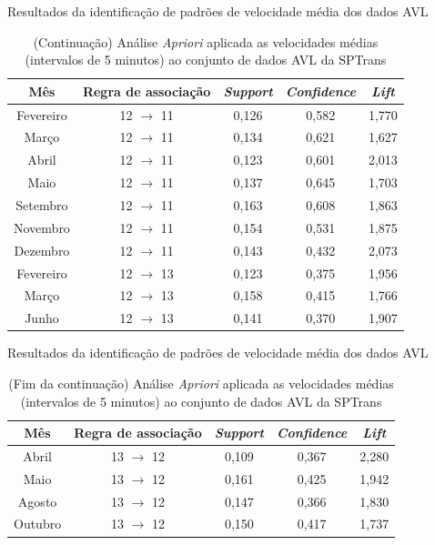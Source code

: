 \documentclass{beamer}
\begin{document}
\begin{frame}{Resultados da identificação de padrões de velocidade média dos dados AVL}
\begin{table}[!htb]
\centering
\caption {(Continuação) Análise \textit{Apriori} aplicada as velocidades médias (intervalos de 5 minutos) ao conjunto de dados AVL da SPTrans}
\label {tab:aprioriFull}
\begin{adjustbox}{max height=10mm, width=4in}
\begin{tabular}{c|c|c|c|c}
\toprule
\textbf{Mês} & \textbf{Regra de associação} & \textit{\textbf{Support}} & \textit{\textbf{Confidence}} & \textit{\textbf{Lift}} \\
\midrule
Fevereiro & 12 $\rightarrow$ 11 & 0,126 & 0,582 & 1,770\\
Março & 12 $\rightarrow$ 11 & 0,134 & 0,621 & 1,627\\
Abril & 12 $\rightarrow$ 11 & 0,123 & 0,601 & 2,013\\
Maio & 12 $\rightarrow$ 11 & 0,137 & 0,645 & 1,703\\
Setembro & 12 $\rightarrow$ 11 & 0,163 & 0,608 & 1,863\\
Novembro & 12 $\rightarrow$ 11 & 0,154 & 0,531 & 1,875\\
Dezembro & 12 $\rightarrow$ 11 & 0,143 & 0,432 & 2,073\\
\midrule
Fevereiro & 12 $\rightarrow$ 13 & 0,123 & 0,375 & 1,956\\
Março & 12 $\rightarrow$ 13 & 0,158 & 0,415 & 1,766\\
Junho & 12 $\rightarrow$ 13 & 0,141 & 0,370 & 1,907\\
\bottomrule
\end{tabular}
\end{adjustbox}
\end{table}
\end{frame}
\begin{frame}{Resultados da identificação de padrões de velocidade média dos dados AVL}
\begin{table}[!htb]
\centering
\caption {(Fim da continuação) Análise \textit{Apriori} aplicada as velocidades médias (intervalos de 5 minutos) ao conjunto de dados AVL da SPTrans}
\label {tab:aprioriFull}
\begin{adjustbox}{max height=10mm, width=4in}
\begin{tabular}{c|c|c|c|c}
\toprule
\textbf{Mês} & \textbf{Regra de associação} & \textit{\textbf{Support}} & \textit{\textbf{Confidence}} & \textit{\textbf{Lift}} \\
\midrule
Abril  & 13 $\rightarrow$ 12 & 0,109 & 0,367 & 2,280\\
Maio & 13 $\rightarrow$ 12 & 0,161 & 0,425 & 1,942\\
Agosto & 13 $\rightarrow$ 12 & 0,147 & 0,366 & 1,830\\
Outubro & 13 $\rightarrow$ 12 & 0,150 & 0,417 & 1,737\\
\bottomrule
\end{tabular}
\end{adjustbox}
\end{table}
\end{frame}
\end{document}

